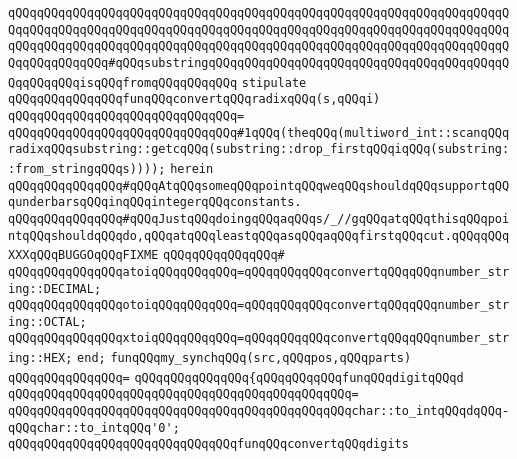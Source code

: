 \verb|qQQqqQQqqQQqqQQqqQQqqQQqqQQqqQQqqQQqqQQqqQQqqQQqqQQqqQQqqQQqqQQqqQQqqQQqqQQqqQQqqQQqqQQqqQQqqQQqqQQqqQQqqQQqqQQqqQQqqQQqqQQqqQQqqQQqqQQqqQQqqQQqqQQqqQQqqQQqqQQqqQQqqQQqqQQqqQQqqQQqqQQqqQQqqQQqqQQqqQQqqQQqqQQqqQQqqQQqqQQqqQQq#qQQqsubstringqQQqqQQqqQQqqQQqqQQqqQQqqQQqqQQqqQQqqQQqqQQqqQQqqQQqisqQQqfromqQQqqQQqqQQq|\newline
\verb|stipulate|\newline
\newline
\verb|qQQqqQQqqQQqqQQqfunqQQqconvertqQQqradixqQQq(s,qQQqi)|\newline
\verb|qQQqqQQqqQQqqQQqqQQqqQQqqQQqqQQq=|\newline
\verb|qQQqqQQqqQQqqQQqqQQqqQQqqQQqqQQq#1qQQq(theqQQq(multiword_int::scanqQQqradixqQQqsubstring::getcqQQq(substring::drop_firstqQQqiqQQq(substring::from_stringqQQqs))));|\newline
\verb|herein|\newline
\verb|qQQqqQQqqQQqqQQq#qQQqAtqQQqsomeqQQqpointqQQqweqQQqshouldqQQqsupportqQQqunderbarsqQQqinqQQqintegerqQQqconstants.|\newline
\verb|qQQqqQQqqQQqqQQq#qQQqJustqQQqdoingqQQqaqQQqs/_//gqQQqatqQQqthisqQQqpointqQQqshouldqQQqdo,qQQqatqQQqleastqQQqasqQQqaqQQqfirstqQQqcut.qQQqqQQqXXXqQQqBUGGOqQQqFIXME|\newline
\verb|qQQqqQQqqQQqqQQq#|\newline
\verb|qQQqqQQqqQQqqQQqatoiqQQqqQQqqQQq=qQQqqQQqqQQqconvertqQQqqQQqnumber_string::DECIMAL;|\newline
\verb|qQQqqQQqqQQqqQQqotoiqQQqqQQqqQQq=qQQqqQQqqQQqconvertqQQqqQQqnumber_string::OCTAL;|\newline
\verb|qQQqqQQqqQQqqQQqxtoiqQQqqQQqqQQq=qQQqqQQqqQQqconvertqQQqqQQqnumber_string::HEX;|\newline
\verb|end;|\newline
\newline
\verb|funqQQqmy_synchqQQq(src,qQQqpos,qQQqparts)|\newline
\verb|qQQqqQQqqQQqqQQq=|\newline
\verb|qQQqqQQqqQQqqQQq{qQQqqQQqqQQqfunqQQqdigitqQQqd|\newline
\verb|qQQqqQQqqQQqqQQqqQQqqQQqqQQqqQQqqQQqqQQqqQQqqQQq=|\newline
\verb|qQQqqQQqqQQqqQQqqQQqqQQqqQQqqQQqqQQqqQQqqQQqqQQqchar::to_intqQQqdqQQq-qQQqchar::to_intqQQq'0';|\newline
\newline
\verb|qQQqqQQqqQQqqQQqqQQqqQQqqQQqqQQqfunqQQqconvertqQQqdigits|\newline
